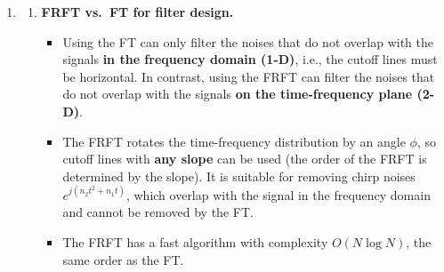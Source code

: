 \documentclass[12pt,a4paper]{article}
\begin{document}
\begin{enumerate}
\textbf{Frequency range:} $0\le f-\phi'(t)/2\pi\le3d=1$, i.e., the width is $1$, which matches $(1,1)\to(1,2)$ and $(10,1)\to(10,2)$. The lower boundary $f=\phi'(t)/2\pi$ is the parabola through $(1,1)$, $(\frac{11}2,0)$, $(10,1)$ with vertex $(\frac{11}2,0)$:
\[
\frac{\phi'(t)}{2\pi}=k\Big(t-\frac{11}2\Big)^2,\qquad k\cdot\frac{81}4=1\ \Rightarrow\ k=\frac4{81}.
\]
Then
\[
\phi'(t)=3at^2+2bt+c=\frac{8\pi}{81}\Big(t^2-11t+\frac{121}4\Big)
\ \Rightarrow\ a=\frac{8\pi}{243},\ b=-\frac{44\pi}{81},\ c=\frac{242\pi}{81}.
\]
Therefore,
\[
\boxed{a=\tfrac{8\pi}{243}\approx0.1034,\quad b=-\tfrac{44\pi}{81}\approx-1.7065,\quad c=\tfrac{242\pi}{81}\approx9.3860,\quad d=\tfrac13,\quad e=-\tfrac13}
\]
Note 1: since $\phi(t)$ has a $t^3$ term, the generalized shearing of the WDF is only an approximation, so the location of the WDF is described by the instantaneous frequency $\phi'(t)/2\pi$.

Note 2: if $d<0$, then $d=-\frac13$, $e=\frac{10}3$, and $f-\phi'(t)/2\pi\in[-1,0]$. The lower boundary becomes $\phi'(t)/2\pi-1$, which gives the same $a,b$ and $c=\frac{242\pi}{81}+2\pi=\frac{404\pi}{81}$. This is also a valid answer.

\item
\begin{enumerate}[label=(\alph*)]
  \item \textbf{FRFT vs.\ FT for filter design.}
  \begin{itemize}
    \item Using the FT can only filter the noises that do not overlap with the signals \textbf{in the frequency domain (1-D)}, i.e., the cutoff lines must be horizontal. In contrast, using the FRFT can filter the noises that do not overlap with the signals \textbf{on the time-frequency plane (2-D)}.
    \item The FRFT rotates the time-frequency distribution by an angle $\phi$, so cutoff lines with \textbf{any slope} can be used (the order of the FRFT is determined by the slope). It is suitable for removing chirp noises $e^{j(n_2t^2+n_1t)}$, which overlap with the signal in the frequency domain and cannot be removed by the FT.
    \item The FRFT has a fast algorithm with complexity $O(N\log N)$, the same order as the FT.
  \end{itemize}


\end{enumerate}
\end{enumerate}
\end{document}
